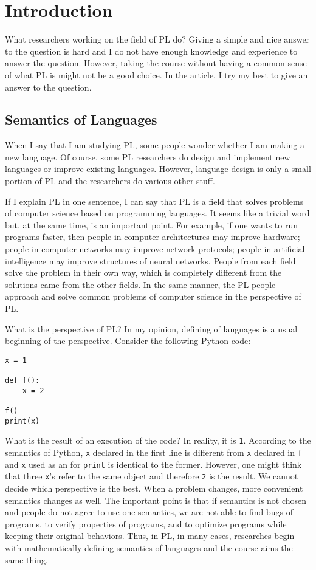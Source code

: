 \setchapterpreamble[u]{\margintoc}
\chapter{Introduction}

What researchers working on the field of PL do? Giving a simple and nice
answer to the question is hard and I do not have enough knowledge and
experience to answer the question. However, taking the course without having a
common sense of what PL is might not be a good choice. In the article, I try
my best to give an answer to the question.

\section{Semantics of Languages}

When I say that I am studying PL, some people wonder whether I am making a new
language. Of course, some PL researchers do design and implement new languages
or improve existing languages. However, language design is only a small
portion of PL and the researchers do various other stuff.

If I explain PL in one sentence, I can say that PL is a field that solves
problems of computer science based on programming languages. It seems like a
trivial word but, at the same time, is an important point. For example, if one
wants to run programs faster, then people in computer architectures may
improve hardware; people in computer networks may improve network protocols;
people in artificial intelligence may improve structures of neural networks.
People from each field solve the problem in their own way, which is completely
different from the solutions came from the other fields. In the same manner,
the PL people approach and solve common problems of computer science in the
perspective of PL.

What is the perspective of PL? In my opinion, defining  of
languages is a usual beginning of the perspective. Consider the following
Python code:

\begin{verbatim}
x = 1

def f():
    x = 2

f()
print(x)
\end{verbatim}

What is the result of an execution of the code? In reality, it is \verb+1+.
According to the semantics of Python,  \verb+x+ declared in the first
line is different from \verb+x+ declared in  \verb+f+ and \verb+x+ used as an
 for \verb+print+ is identical to the former. However, one might think
that three \verb+x+'s refer to the same object and therefore \verb+2+ is the result. We
cannot decide which perspective is the best. When a problem changes, more
convenient semantics changes as well. The important point is that if semantics
is not chosen and people do not agree to use one semantics, we are not able to
find bugs of programs, to verify properties of programs, and to optimize
programs while keeping their original behaviors. Thus, in PL, in many cases,
researches begin with mathematically defining semantics of languages and the
course aims the same thing.

